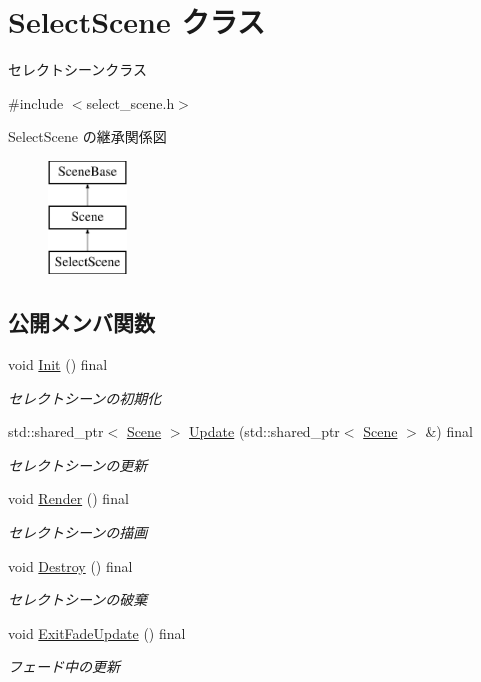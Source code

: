 \hypertarget{class_select_scene}{}\section{Select\+Scene クラス}
\label{class_select_scene}


セレクトシーンクラス  




{\ttfamily \#include $<$select\+\_\+scene.\+h$>$}

Select\+Scene の継承関係図\begin{figure}[H]
\begin{center}
\leavevmode
\includegraphics[height=3.000000cm]{class_select_scene}
\end{center}
\end{figure}
\subsection*{公開メンバ関数}
\begin{DoxyCompactItemize}
\item 
void \mbox{\hyperlink{class_select_scene_a20b3a902b5521d7494ed353731b3065d}{Init}} () final
\begin{DoxyCompactList}\small\item\em セレクトシーンの初期化 \end{DoxyCompactList}\item 
std\+::shared\+\_\+ptr$<$ \mbox{\hyperlink{class_scene}{Scene}} $>$ \mbox{\hyperlink{class_select_scene_a0cef696ddf74155e061cc5f9f2e06419}{Update}} (std\+::shared\+\_\+ptr$<$ \mbox{\hyperlink{class_scene}{Scene}} $>$ \&) final
\begin{DoxyCompactList}\small\item\em セレクトシーンの更新 \end{DoxyCompactList}\item 
void \mbox{\hyperlink{class_select_scene_a85445536ad84d5232c724ecb7d48b8aa}{Render}} () final
\begin{DoxyCompactList}\small\item\em セレクトシーンの描画 \end{DoxyCompactList}\item 
void \mbox{\hyperlink{class_select_scene_a938293516c0e1ae5bb09dbab81bc78d9}{Destroy}} () final
\begin{DoxyCompactList}\small\item\em セレクトシーンの破棄 \end{DoxyCompactList}\item 
void \mbox{\hyperlink{class_select_scene_a546190bc143f6d7a3055935f97b55596}{Exit\+Fade\+Update}} () final
\begin{DoxyCompactList}\small\item\em フェード中の更新 \end{DoxyCompactList}\end{DoxyCompactItemize}



